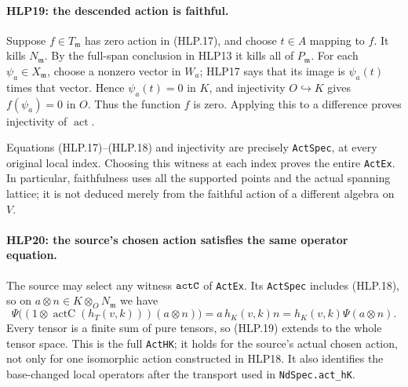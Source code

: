 \paragraph{HLP19: the descended action is faithful.}
\label{claim:HLP19}
Suppose \(f\in T_{\mathfrak m}\) has zero action in (HLP.17),
and choose \(t\in A\) mapping to \(f\). It kills
\(N_{\mathfrak m}\). By the full-span conclusion in HLP13 it
kills all of \(P_{\mathfrak m}\). For each
\(\psi_a\in X_{\mathfrak m}\), choose a nonzero vector in
\(W_a\); HLP17 says that its image is \(\psi_a(t)\) times that
vector. Hence \(\psi_a(t)=0\) in \(K\), and injectivity
\(O\hookrightarrow K\) gives \(f(\psi_a)=0\) in \(O\).
Thus the function \(f\) is zero. Applying this to a difference
proves injectivity of \(\operatorname{act}\).

Equations (HLP.17)--(HLP.18) and injectivity are precisely
\texttt{Act\allowbreak Spec}, at every original local index. Choosing this
witness at each index proves the entire \texttt{Act\allowbreak Ex}. In
particular, faithfulness uses all the supported points and the
actual spanning lattice; it is not deduced merely from the
faithful action of a different algebra on \(V\).

\paragraph{HLP20: the source's chosen action satisfies the same operator equation.}
\label{claim:HLP20}
The source may select any witness \(\texttt{act\allowbreak C}\) of
\texttt{Act\allowbreak Ex}. Its \texttt{Act\allowbreak Spec} includes (HLP.18), so on
\(a\otimes n\in K\otimes_ON_{\mathfrak m}\) we have
\[
 \Psi\bigl((1\otimes\operatorname{actC}(h_T(v,k)))(a\otimes n)\bigr)
       =a\,h_K(v,k)n
       =h_K(v,k)\Psi(a\otimes n).                   \tag{HLP.19}
\]
Every tensor is a finite sum of pure tensors, so (HLP.19) extends
to the whole tensor space. This is the full \texttt{Act\allowbreak HK}; it
holds for the source's actual chosen action, not only for one
isomorphic action constructed in HLP18. It also identifies the
base-changed local operators after the transport used in
\texttt{Nd\allowbreak Spec.act\_\allowbreak h\allowbreak K}.

